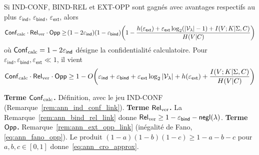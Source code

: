 \begin{sloppypar}
\begin{corollary}\label{cor:ann_cro_from_games}
Si IND-CONF, BIND-REL et EXT-OPP sont gagn\'es avec avantages respectifs au plus
$\varepsilon_{\mathsf{ind}}$, $\varepsilon_{\mathsf{bind}}$, $\varepsilon_{\mathsf{ext}}$, alors
\begin{equation}
\mathsf{Conf}_{\mathrm{calc}} \cdot \mathsf{Rel}_{\mathrm{ver}} \cdot \mathsf{Opp}
\geq \!\left(1-2\varepsilon_{\mathsf{ind}}\right)\!
\left(1-\varepsilon_{\mathsf{bind}}\right)\!
\left(1 - \frac{h(\varepsilon_{\mathsf{ext}})
  + \varepsilon_{\mathsf{ext}}\log_2(|\mathcal{V}_\lambda|-1)
  + I(V;K|\Sigma,C)}
  {H(V|C)}\right)
\label{eq:ann_cro_product_games}
\end{equation}
o\`u $\mathsf{Conf}_{\mathrm{calc}} = 1 - 2\varepsilon_{\mathsf{ind}}$ d\'esigne la confidentialit\'e
calculatoire. Pour $\varepsilon_{\mathsf{ind}},\varepsilon_{\mathsf{bind}},
\varepsilon_{\mathsf{ext}} \ll 1$, il vient
\begin{equation}
\mathsf{Conf}_{\mathrm{calc}} \cdot \mathsf{Rel}_{\mathrm{ver}} \cdot \mathsf{Opp}
\geq 1 - O\!\left(\varepsilon_{\mathsf{ind}}
  + \varepsilon_{\mathsf{bind}}
  + \varepsilon_{\mathsf{ext}}\log_2|\mathcal{V}_\lambda| + h(\varepsilon_{\mathsf{ext}})
  + \frac{I(V;K|\Sigma,C)}{H(V|C)}\right)
\label{eq:ann_cro_approx}
\end{equation}
\end{corollary}

\begin{Preuve}
\textbf{Terme $\mathsf{Conf}_{\mathrm{calc}}$.} D\'efinition, avec le jeu IND-CONF
(Remarque~\ref{rem:ann_ind_conf_link}).
\textbf{Terme $\mathsf{Rel}_{\mathrm{ver}}$.} La Remarque~\ref{rem:ann_bind_rel_link} donne
$\mathsf{Rel}_{\mathrm{ver}} \geq 1-\varepsilon_{\mathsf{bind}} - \mathsf{negl}(\lambda)$.
\textbf{Terme $\mathsf{Opp}$.} Remarque~\ref{rem:ann_ext_opp_link}
(in\'egalit\'e de Fano, \eqref{eq:ann_fano_opp}).
Le produit $(1-a)(1-b)(1-c) \geq 1-a-b-c$ pour $a,b,c \in [0,1]$
donne~\eqref{eq:ann_cro_approx}.
\end{Preuve}


\end{sloppypar}
